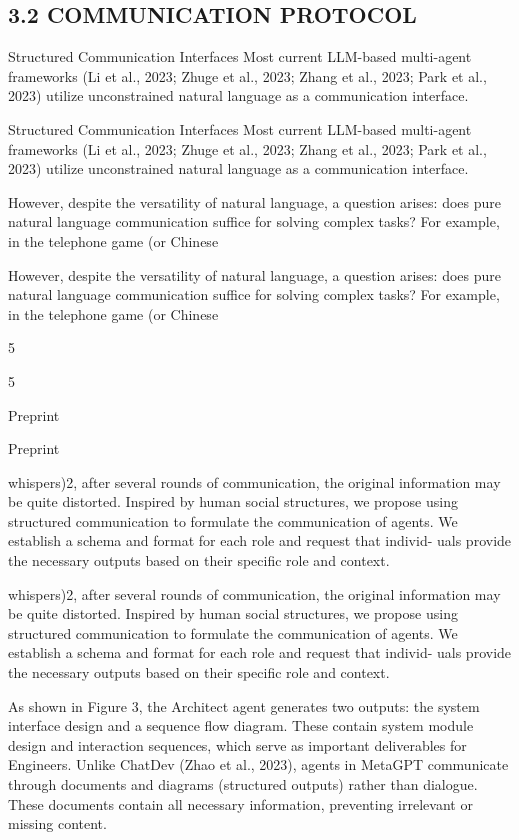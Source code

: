\documentclass[12pt]{article}
\begin{document}
\subsection{3.2 COMMUNICATION PROTOCOL}


Structured Communication Interfaces Most current LLM-based multi-agent frameworks (Li
et al., 2023; Zhuge et al., 2023; Zhang et al., 2023; Park et al., 2023) utilize unconstrained natural
language as a communication interface.


Structured Communication Interfaces Most current LLM-based multi-agent frameworks (Li
et al., 2023; Zhuge et al., 2023; Zhang et al., 2023; Park et al., 2023) utilize unconstrained natural
language as a communication interface.


However, despite the versatility of natural language, a question arises: does pure natural language
communication suffice for solving complex tasks? For example, in the telephone game (or Chinese


However, despite the versatility of natural language, a question arises: does pure natural language
communication suffice for solving complex tasks? For example, in the telephone game (or Chinese


5


5


Preprint


Preprint


whispers)2, after several rounds of communication, the original information may be quite distorted.
Inspired by human social structures, we propose using structured communication to formulate the
communication of agents. We establish a schema and format for each role and request that individ-
uals provide the necessary outputs based on their specific role and context.


whispers)2, after several rounds of communication, the original information may be quite distorted.
Inspired by human social structures, we propose using structured communication to formulate the
communication of agents. We establish a schema and format for each role and request that individ-
uals provide the necessary outputs based on their specific role and context.


As shown in Figure 3, the Architect agent generates two outputs: the system interface design and a
sequence flow diagram. These contain system module design and interaction sequences, which serve
as important deliverables for Engineers. Unlike ChatDev (Zhao et al., 2023), agents in MetaGPT
communicate through documents and diagrams (structured outputs) rather than dialogue. These
documents contain all necessary information, preventing irrelevant or missing content.
\end{document}
